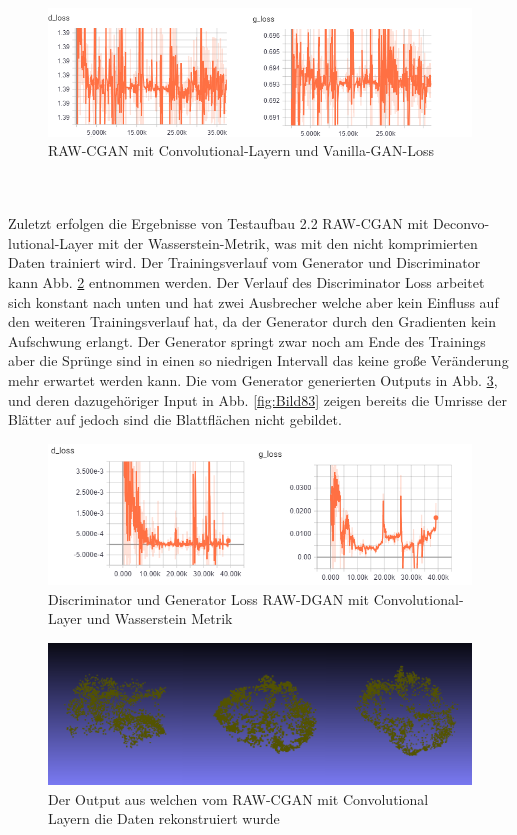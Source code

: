 \documentclass{llncs}
\begin{document}
\begin{figure}[htbp] 
	\centering
	\includegraphics[width=1.0\textwidth]{cgan_loss_vanilla.png}
	\caption{RAW-CGAN mit Convolutional-Layern und Vanilla-GAN-Loss}
	\label{fig:Bild79}
\end{figure}
\newpage
~\\\\
Zuletzt erfolgen die Ergebnisse von Testaufbau 2.2 RAW-CGAN mit Deconvo-lutional-Layer mit der Wasserstein-Metrik, was mit den nicht komprimierten Daten trainiert wird.  Der Trainingsverlauf vom Generator und Discriminator kann Abb. \ref{fig:Bild1001} entnommen werden.  Der Verlauf des Discriminator Loss arbeitet sich konstant nach unten und hat zwei Ausbrecher welche aber kein Einfluss auf den weiteren Trainingsverlauf hat, da der Generator durch den Gradienten kein Aufschwung erlangt. Der Generator springt zwar noch am Ende des Trainings aber die Sprünge sind in einen so niedrigen Intervall das keine große Veränderung mehr erwartet werden kann. Die vom Generator generierten Outputs in Abb. \ref{fig:Bild82}, und deren dazugehöriger Input in Abb. \ref{fig:Bild83} zeigen bereits die Umrisse der Blätter auf jedoch sind die Blattflächen nicht gebildet. 
\begin{figure}[htbp] 
	\centering
	\includegraphics[width=1.0\textwidth]{cgan_ws_loss.png}
	\caption{Discriminator und Generator Loss RAW-DGAN mit Convolutional-Layer und Wasserstein Metrik}
	\label{fig:Bild1001}
\end{figure}
\begin{figure}[htbp] 
	\centering
	\includegraphics[width=1.0\textwidth]{raw_cgan_ws_fake.png}
	\caption{Der Output aus welchen vom RAW-CGAN mit Convolutional Layern die Daten rekonstruiert wurde}
	\label{fig:Bild82}
\end{figure}
\end{document}
